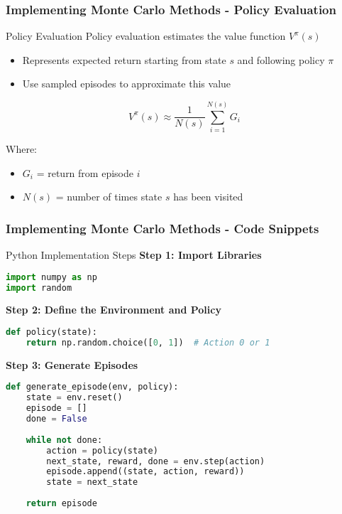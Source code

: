\documentclass[aspectratio=169]{beamer}
\begin{document}
\begin{frame}[fragile]
    \frametitle{Implementing Monte Carlo Methods - Policy Evaluation}
    \begin{block}{Policy Evaluation}
        Policy evaluation estimates the value function \( V^{\pi}(s) \)
        \begin{itemize}
            \item Represents expected return starting from state \( s \) and following policy \( \pi \)
            \item Use sampled episodes to approximate this value
        \end{itemize}
        
        \begin{equation}
            V^{\pi}(s) \approx \frac{1}{N(s)} \sum_{i=1}^{N(s)} G_i
        \end{equation}
        
        Where:
        \begin{itemize}
            \item \( G_i \) = return from episode \( i \)
            \item \( N(s) \) = number of times state \( s \) has been visited
        \end{itemize}
    \end{block}
\end{frame}

\begin{frame}[fragile]
    \frametitle{Implementing Monte Carlo Methods - Code Snippets}
    \begin{block}{Python Implementation Steps}
        \textbf{Step 1: Import Libraries}
        \begin{lstlisting}[language=Python]
import numpy as np
import random
        \end{lstlisting}

        \textbf{Step 2: Define the Environment and Policy}
        \begin{lstlisting}[language=Python]
def policy(state):
    return np.random.choice([0, 1])  # Action 0 or 1
        \end{lstlisting}

        \textbf{Step 3: Generate Episodes}
        \begin{lstlisting}[language=Python]
def generate_episode(env, policy):
    state = env.reset()
    episode = []
    done = False
    
    while not done:
        action = policy(state)
        next_state, reward, done = env.step(action)
        episode.append((state, action, reward))
        state = next_state
        
    return episode
        \end{lstlisting}
    \end{block}
\end{frame}
\end{document}
